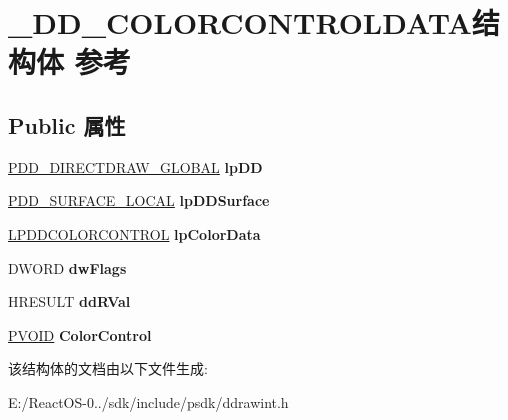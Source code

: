\hypertarget{struct___d_d___c_o_l_o_r_c_o_n_t_r_o_l_d_a_t_a}{}\section{\+\_\+\+D\+D\+\_\+\+C\+O\+L\+O\+R\+C\+O\+N\+T\+R\+O\+L\+D\+A\+T\+A结构体 参考}
\label{struct___d_d___c_o_l_o_r_c_o_n_t_r_o_l_d_a_t_a}
\subsection*{Public 属性}
\begin{DoxyCompactItemize}
\item 
\mbox{\label{struct___d_d___c_o_l_o_r_c_o_n_t_r_o_l_d_a_t_a_a191498895e51800b74e7727030b0288e}} 
\hyperlink{struct___d_d___d_i_r_e_c_t_d_r_a_w___g_l_o_b_a_l}{P\+D\+D\+\_\+\+D\+I\+R\+E\+C\+T\+D\+R\+A\+W\+\_\+\+G\+L\+O\+B\+AL} {\bfseries lp\+DD}
\item 
\mbox{\label{struct___d_d___c_o_l_o_r_c_o_n_t_r_o_l_d_a_t_a_a7c15f98415a4840d00e026340f2a638b}} 
\hyperlink{struct___d_d___s_u_r_f_a_c_e___l_o_c_a_l}{P\+D\+D\+\_\+\+S\+U\+R\+F\+A\+C\+E\+\_\+\+L\+O\+C\+AL} {\bfseries lp\+D\+D\+Surface}
\item 
\mbox{\label{struct___d_d___c_o_l_o_r_c_o_n_t_r_o_l_d_a_t_a_a1d72b4097ff01298e2515ded491e9041}} 
\hyperlink{struct___d_d_c_o_l_o_r_c_o_n_t_r_o_l}{L\+P\+D\+D\+C\+O\+L\+O\+R\+C\+O\+N\+T\+R\+OL} {\bfseries lp\+Color\+Data}
\item 
\mbox{\label{struct___d_d___c_o_l_o_r_c_o_n_t_r_o_l_d_a_t_a_a812625b17d5c2070f7eef3c825357c54}} 
D\+W\+O\+RD {\bfseries dw\+Flags}
\item 
\mbox{\label{struct___d_d___c_o_l_o_r_c_o_n_t_r_o_l_d_a_t_a_af53ffa7041c3795f166872d182dd9200}} 
H\+R\+E\+S\+U\+LT {\bfseries dd\+R\+Val}
\item 
\mbox{\label{struct___d_d___c_o_l_o_r_c_o_n_t_r_o_l_d_a_t_a_ab7d50a25a901d3fe3e923f06b0d8021f}} 
\hyperlink{interfacevoid}{P\+V\+O\+ID} {\bfseries Color\+Control}
\end{DoxyCompactItemize}


该结构体的文档由以下文件生成\+:\begin{DoxyCompactItemize}
\item 
E\+:/\+React\+O\+S-\/0../sdk/include/psdk/ddrawint.\+h\end{DoxyCompactItemize}
